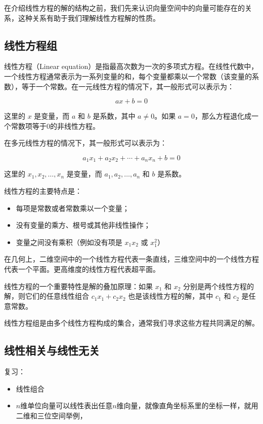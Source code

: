 在介绍线性方程的解的结构之前，我们先来认识向量空间中的向量可能存在的关系，这种关系有助于我们理解线性方程解的性质。

\subsection{线性方程组}
\label{subsec:线性方程组}

线性方程（Linear equation）是指最高次数为一次的多项式方程。在线性代数中，一个线性方程通常表示为一系列变量的和，每个变量都乘以一个常数（该变量的系数），等于一个常数。在一元线性方程的情况下，其一般形式可以表示为：

\[ ax + b = 0 \]

这里的 \( x \) 是变量，而 \( a \) 和 \( b \) 是系数，其中 \( a \neq 0 \)。如果 \( a = 0 \)，那么方程退化成一个常数项等于0的非线性方程。

在多元线性方程的情况下，其一般形式可以表示为：

\[ a_1x_1 + a_2x_2 + \cdots + a_nx_n + b = 0 \]

这里的 \( x_1, x_2, \ldots, x_n \) 是变量，而 \( a_1, a_2, \ldots, a_n \) 和 \( b \) 是系数。

线性方程的主要特点是：

\begin{itemize}
    \item 每项是常数或者常数乘以一个变量；
    \item 没有变量的乘方、根号或其他非线性操作；
    \item 变量之间没有乘积（例如没有项是 \( x_1x_2 \) 或 \( x_1^2 \)）
\end{itemize}

在几何上，二维空间中的一个线性方程代表一条直线，三维空间中的一个线性方程代表一个平面。更高维度的线性方程代表超平面。

线性方程的一个重要特性是解的叠加原理：如果 \( x_1 \) 和 \( x_2 \) 分别是两个线性方程的解，则它们的任意线性组合 \( c_1x_1 + c_2x_2 \) 也是该线性方程的解，其中 \( c_1 \) 和 \( c_2 \) 是任意常数。

线性方程组是由多个线性方程构成的集合，通常我们寻求这些方程共同满足的解。

\subsection{线性相关与线性无关}
\label{subsec:线性相关与线性无关}

\begin{note}
    复习：
    \begin{itemize}
        \item 线性组合
        \item $n$维单位向量可以线性表出任意$n$维向量，就像直角坐标系里的坐标一样，就用二维和三位空间举例，
    \end{itemize}
\end{note}

